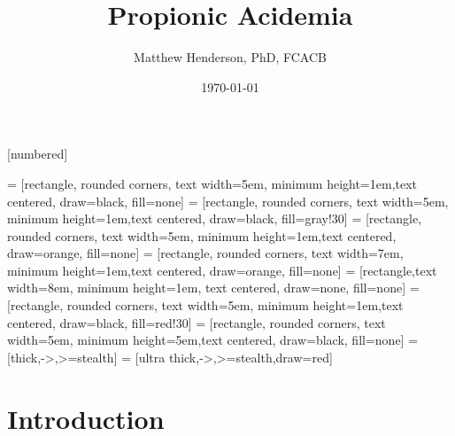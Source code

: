 \documentclass[presentation, smaller]{beamer}
\author{Matthew Henderson, PhD, FCACB}
\date{\today}
\title{Propionic Acidemia}
\institute[NSO]{Newborn Screening Ontario | The University of Ottawa}
\begin{document}
\maketitle

\vspace{220pt}
\beamertemplatenavigationsymbolsempty
{}[numbered]

 = [rectangle, rounded corners, text width=5em, minimum height=1em,text centered, draw=black, fill=none]
 = [rectangle, rounded corners, text width=5em, minimum height=1em,text centered, draw=black, fill=gray!30]
 = [rectangle, rounded corners, text width=5em, minimum height=1em,text centered, draw=orange, fill=none]
 = [rectangle, rounded corners, text width=7em, minimum height=1em,text centered, draw=orange, fill=none]
 = [rectangle,text width=8em, minimum height=1em, text centered, draw=none, fill=none]
 = [rectangle, rounded corners, text width=5em, minimum height=1em,text centered, draw=black, fill=red!30]
 = [rectangle, rounded corners, text width=5em, minimum height=5em,text centered, draw=black, fill=none]
 = [thick,->,>=stealth]
 = [ultra thick,->,>=stealth,draw=red]

\section{Introduction}
\label{sec:orgheadline9}
\end{document}
